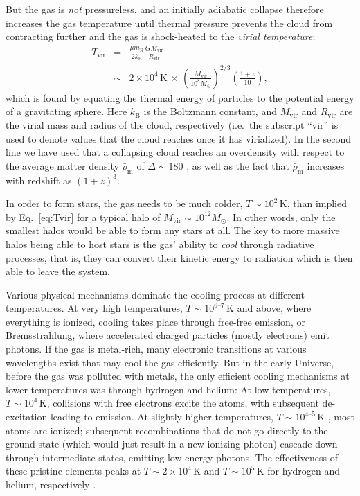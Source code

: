 \documentclass[useAMS]{aa}
\begin{document}
But the gas is \emph{not} pressureless, and an initially adiabatic collapse therefore increases the gas temperature until thermal pressure prevents the cloud from contracting further and the gas is shock-heated to the \emph{virial temperature}:
\begin{eqnarray}
    \label{eq:Tvir}
    \nonumber
    T_\mathrm{vir} & = & \frac{\mu m_\mathrm{H}}{2 k_\mathrm{B}} \frac{G M_\mathrm{vir}}{R_\mathrm{vir}}\\
    & \sim & 2\times10^4\,\mathrm{K}\,\times\, \left( \frac{M_\mathrm{vir}}{10^8M_\odot} \right)^{2/3}
          \left( \frac{1+z}{10} \right),
\end{eqnarray}
which is found by equating the thermal energy of particles to the potential energy of a gravitating sphere.
Here $k_\mathrm{B}$ is the Boltzmann constant, and $M_\mathrm{vir}$ and $R_\mathrm{vir}$ are the virial mass and radius of the cloud, respectively (i.e.~the subscript ``vir'' is used to denote values that the cloud reaches once it has virialized).
In the second line we have used that a collapsing cloud reaches an overdensity with respect to the average matter density $\bar{\rho}_\mathrm{m}$ of $\Delta\sim180$ \citep[e.g.][]{Binney2008}, as well as the fact that $\bar{\rho}_\mathrm{m}$ increases with redshift as $(1+z)^3$.

In order to form stars, the gas needs to be much colder, $T\sim10^2\,\mathrm{K}$, than implied by Eq.~\ref{eq:Tvir} for a typical halo of $M_\mathrm{vir}\sim10^{12} M_\odot$.
In other words, only the smallest halos would be able to form any stars at all.
The key to more massive halos being able to host stars is the gas' ability to \emph{cool} through radiative processes, that is, they can convert their kinetic energy to radiation which is then able to leave the system.

Various physical mechanisms dominate the cooling process at different temperatures.
At very high temperatures, $T\sim10^{6\text{--}7}\,\mathrm{K}$ and above, where everything is ionized, cooling takes place through free-free emission, or Bremsstrahlung, where accelerated charged particles (mostly electrons) emit photons.
If the gas is metal-rich, many electronic transitions at various wavelengths exist that may cool the gas efficiently.
But in the early Universe, before the gas was polluted with metals, the only efficient cooling mechanisms at lower temperatures was through hydrogen and helium:
At low temperatures, $T\sim10^4\,\mathrm{K}$, collisions with free electrons excite the atoms, with subsequent de-excitation leading to emission.
At slightly higher temperatures, $T\sim10^{4\text{--}5}\,\mathrm{K}$ , most atoms are ionized; subsequent recombinations that do not go directly to the ground state (which would just result in a new ionizing photon) cascade down through intermediate states, emitting low-energy photons.
The effectiveness of these pristine elements peaks at $T\sim2\times10^4\,\mathrm{K}$ and $T\sim10^5\,\mathrm{K}$ for hydrogen and helium, respectively \citep[see e.g.][]{Katz1996}.
\end{document}
